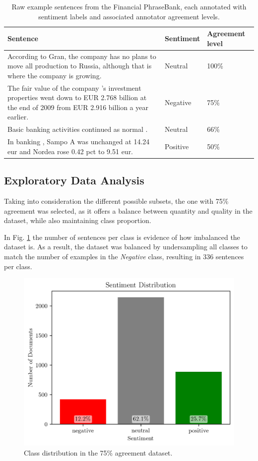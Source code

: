 \documentclass[conference]{IEEEtran}
\begin{document}
\begin{table}[H]
\centering
\caption{Raw example sentences from the Financial PhraseBank, each annotated with sentiment labels and associated annotator agreement levels.}
\label{tab:fpb_examples}
\begin{tabular}{p{4.0cm}p{1.8cm}p{1.5cm}}
\toprule
\textbf{Sentence} & \textbf{Sentiment} & \textbf{Agreement level} \\
\midrule
According to Gran, the company has no plans to move all production to Russia, although that is where the company is growing. & Neutral & 100\% \\
The fair value of the company 's investment properties went down to EUR 2.768 billion at the end of 2009 from EUR 2.916 billion a year earlier. & Negative & 75\% \\
Basic banking activities continued as normal . & Neutral & 66\% \\
In banking , Sampo A was unchanged at 14.24 eur and Nordea rose 0.42 pct to 9.51 eur. & Positive & 50\% \\
\bottomrule
\end{tabular}
\end{table}

\subsection{Exploratory Data Analysis}

Taking into consideration the different possible subsets, the one with 75\% agreement was selected, as it offers a balance between quantity and quality in the dataset, while also maintaining class proportion.

In Fig. \ref{fig:sentiment_distribution} the number of sentences per class is evidence of how imbalanced the dataset is. As a result, the dataset was balanced by undersampling all classes to match the number of examples in the \textit{Negative} class, resulting in 336 sentences per class.

\begin{figure}[H]
    \centering
    \includegraphics[width=1\linewidth]{assets/sentiment_distribution.png}
    \caption{Class distribution in the 75\% agreement dataset.}
    \label{fig:sentiment_distribution}
\end{figure}
\end{document}
